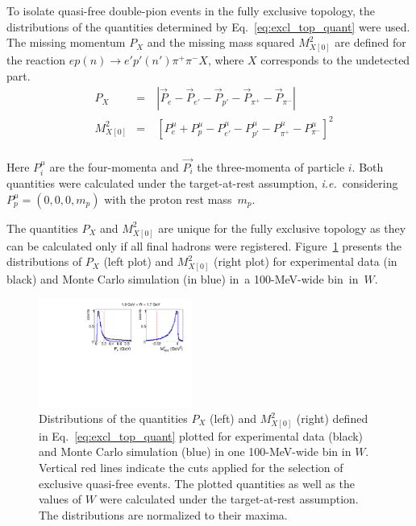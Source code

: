 \documentclass[prc,twocolumn,superscriptaddress,showpacs,amssymb,amsmath,amsfonts,aps,nofootinbib]{revtex4-1}
\begin{document}
To isolate quasi-free double-pion events in the fully exclusive topology, the distributions of the quantities determined by Eq.\!~\eqref{eq:excl_top_quant} were used. The missing momentum $P_{X}$ and the missing mass squared $M^{2}_{X[0]}$ are defined for the reaction $ep(n)\rightarrow e'p'(n')\pi^{+}\pi^{-}X$, where $X$ corresponds to the undetected part.
\begin{equation}
\begin{aligned}
&P_{X}&=&~|\overrightarrow{P}_{e} - \overrightarrow{P}_{e'}- \overrightarrow{P}_{p'} - \overrightarrow{P}_{\pi^{+}} - \overrightarrow{P}_{\pi^{-}}|\\[-2pt]
&M_{X[0]}^{2}&=&~[P_{e}^{\mu} + P_{p}^{\mu}- P_{e'}^{\mu}- P_{p'}^{\mu}-  P_{\pi^{+}}^{\mu} - P_{\pi^{-}}^{\mu}]^{2}\\[-2pt]
\end{aligned}\label{eq:excl_top_quant}
\end{equation}

Here $P_{i}^{\mu}$ are the four-momenta and $\overrightarrow{P_{i}}$ the three-momenta of particle $i$. Both quantities were calculated under the target-at-rest assumption, {\it i.e.}~considering $P^{\mu}_{p} = (0,0,0,m_{p})$ with the proton rest mass~$m_{p}$.


The quantities $P_{X}$ and $M^{2}_{X[0]}$ are unique for the fully exclusive topology as they can be calculated only if all final hadrons were registered. Figure~\ref{fig:excl_top_cut} presents the distributions of $P_{X}$ (left plot) and $M^{2}_{X[0]}$ (right plot) for experimental data (in black) and Monte Carlo simulation (in blue) in~a 100-MeV-wide bin~in~$W$. 



\begin{figure}[htp]
\begin{center}
\includegraphics[width=0.45\textwidth,keepaspectratio]{pictures/event_selection/excl_cut_fully_extop2.pdf}
\caption{Distributions of the quantities $P_{X}$ (left) and $M^{2}_{X[0]}$ (right) defined in Eq.\!~\eqref{eq:excl_top_quant} plotted for experimental data (black) and Monte Carlo simulation (blue) in one 100-MeV-wide bin in $W$. Vertical red lines indicate the cuts applied for the selection of exclusive quasi-free events. The plotted quantities as well as the values of $W$ were calculated under the target-at-rest assumption. The distributions are normalized to their maxima.}
\label{fig:excl_top_cut}
\end{center}
\end{figure}
\end{document}
